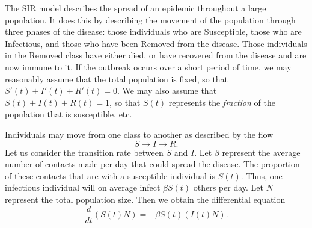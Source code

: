 % 
% 
% 
% 
% 
% 
% 
% 
The SIR model describes the spread of an epidemic throughout a large population. It does this by describing the movement of the population through three phases of the disease: those individuals who are Susceptible, those who are Infectious, and those who have been Removed from the disease. Those individuals in the Removed class have either died, or have recovered from the disease and are now immune to it. If the outbreak occurs over a short period of time, we may reasonably assume that the total population is fixed, so that $S'(t) + I'(t) + R'(t) = 0$.  We may also assume that $S(t) + I(t) + R(t) = 1$, so that $S(t)$ represents the \textit{fraction} of the population that is susceptible, etc. 

Individuals may move from one class to another as described by the flow 
\[S \to I \to R.\] Let us consider the transition rate between $S$ and $I $. Let $\beta$ represent the average number of contacts made per day that could spread the disease. The proportion of these contacts that are with a susceptible individual is $S(t)$. Thus, one infectious individual will on average infect $\beta S(t)$ others per day. Let $N$ represent the total population size. Then we obtain the differential equation
 \[\frac{d}{dt}(S(t) N) = -\beta S(t) (I(t) N).\]
 
